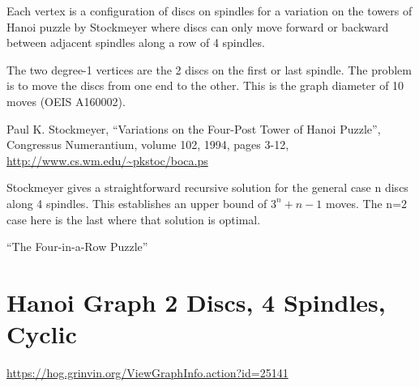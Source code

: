 \documentclass{article}
\begin{document}
Each vertex is a configuration of discs on spindles for a variation on the towers of Hanoi puzzle by Stockmeyer where discs can only move forward or backward between adjacent spindles along a row of 4 spindles.

The two degree-1 vertices are the 2 discs on the first or last
spindle.  The problem is to move the discs from one end to the other.
This is the graph diameter of 10 moves (OEIS A160002).

Paul K. Stockmeyer, ``Variations on the Four-Post Tower of Hanoi
Puzzle'', Congressus Numerantium, volume 102, 1994, pages 3-12,
\url{http://www.cs.wm.edu/~pkstoc/boca.ps}



Stockmeyer gives a straightforward recursive solution for the general case n discs along 4 spindles.  This establishes an upper bound of $3^n+n-1$ moves.  The n=2 case here is the last where that solution is optimal.

``The Four-in-a-Row Puzzle''


\section{Hanoi Graph 2 Discs, 4 Spindles, Cyclic}

\url{https://hog.grinvin.org/ViewGraphInfo.action?id=25141}

\begin{center}
\end{center}
\end{document}
